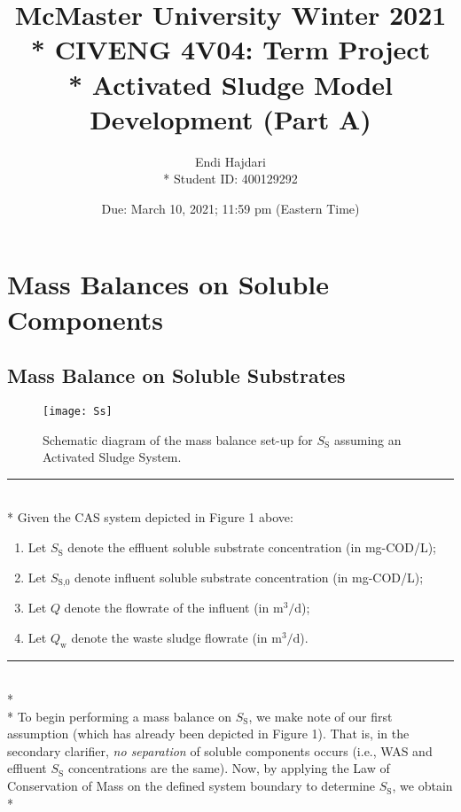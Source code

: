 \documentclass[]{article}
\title{\large{McMaster University Winter 2021} \huge \\* CIVENG 4V04: Term Project \\* \LARGE Activated Sludge Model Development (Part A)}
\author{Endi Hajdari \\* Student ID: 400129292}
\date{Due: March 10, 2021; 11:59 pm (Eastern Time)}
\begin{document}
	
	\maketitle
	\doublespacing
	\tableofcontents
	\singlespacing
	\newpage
	\section{Mass Balances on Soluble Components}
	\subsection{Mass Balance on Soluble Substrates}
	\vspace{0.25cm}
		\begin{figure}[H]
		\centering
		\texttt{[image: Ss]}
		\caption{Schematic diagram of the mass balance set-up for $S_{\text{S}}$ assuming an Activated Sludge System.}
	\end{figure} 
		\par\noindent\rule{\textwidth}{0.4pt} \vspace{0.1 cm} \\*
	Given the CAS system depicted in Figure 1 above: \vspace{0.05 cm} \begin{enumerate}[label=(\roman*)]
		\item Let $S_{\text{S}}$ denote the effluent soluble substrate concentration (in mg-COD/L);
		\item Let $S_{\text{S,0}}$ denote influent soluble substrate concentration (in mg-COD/L);
		\item Let $Q$ denote the flowrate of the influent (in $\text{m}^3/\text{d}$);
		\item Let $Q_{\text{w}}$ denote the waste sludge flowrate (in $\text{m}^3/\text{d}$).
	\end{enumerate}
	\par\noindent\rule{\textwidth}{0.4pt} \\* \\*
	\noindent To begin performing a mass balance on $S_{\text{S}}$, we make note of our first assumption (which has already been depicted in Figure 1). That is, in the secondary clarifier, \textit{no separation} of soluble components occurs (i.e., WAS and effluent $S_{\text{S}}$ concentrations are the same). Now, by applying the Law of Conservation of Mass on the defined system boundary to determine $S_{\text{S}}$, we obtain \\* 
\end{document}
